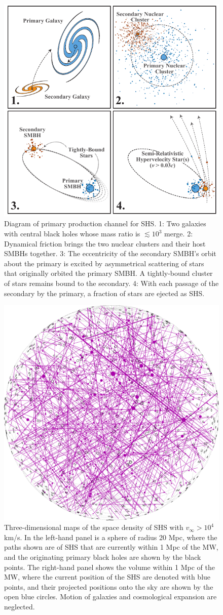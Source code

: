 \documentclass[a4paper,twocolumn]{emulateapj}
\begin{document}
\begin{figure}
\centering\includegraphics[width=\linewidth,clip=true]{shs-diagram}
\caption{Diagram of primary production channel for SHS. 1: Two galaxies with central black holes whose mass ratio is $\lesssim 10^3$ merge. 2: Dynamical friction brings the two nuclear clusters and their host SMBHs together. 3: The eccentricity of the secondary SMBH's orbit about the primary is excited by asymmetrical scattering of stars that originally orbited the primary SMBH. A tightly-bound cluster of stars remains bound to the secondary. 4: With each passage of the secondary by the primary, a fraction of stars are ejected as SHS.}
\label{fig:diagram}
\end{figure}

\begin{figure}
\centering\includegraphics[width=0.45\linewidth,clip=true]{closeview10k-1Mpc}
\caption{Three-dimensional maps of the space density of SHS with $v_{\infty} > 10^{4}$ km/s. In the left-hand panel is a sphere of radius 20 Mpc, where the paths shown are of SHS that are currently within 1 Mpc of the MW, and the originating primary black holes are shown by the black points. The right-hand panel shows the volume within 1 Mpc of the MW, where the current position of the SHS are denoted with blue points, and their projected positions onto the sky are shown by the open blue circles. Motion of galaxies and cosmological expansion are neglected.}
\label{fig:map}
\end{figure}
\end{document}
